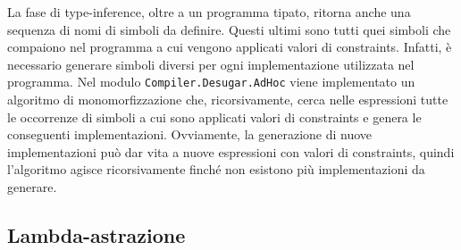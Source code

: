\documentclass[10pt,a4paper]{article}
\begin{document}
La fase di type-inference, oltre a un programma tipato, ritorna anche una sequenza di nomi di simboli da definire.
Questi ultimi sono tutti quei simboli che compaiono nel programma a cui vengono applicati valori di constraints.
Infatti, è necessario generare simboli diversi per ogni implementazione utilizzata nel programma. Nel modulo
\texttt{Compiler.Desugar.AdHoc} viene implementato un algoritmo di monomorfizzazione che, ricorsivamente, cerca
nelle espressioni tutte le occorrenze di simboli a cui sono applicati valori di constraints e
genera le conseguenti implementazioni.
Ovviamente, la generazione di nuove implementazioni può dar vita a nuove espressioni con valori di constraints,
quindi l'algoritmo agisce ricorsivamente finché non esistono più implementazioni da generare.

\subsection{Lambda-astrazione}
\end{document}
